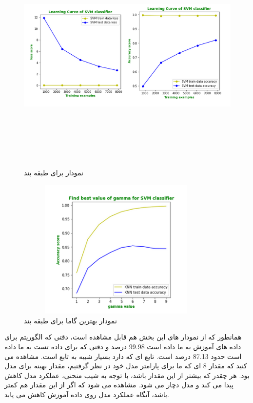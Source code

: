 \documentclass[12pt,onecolumn,a4paper]{article}
\begin{document}
\begin{figure}
  \centering
  \includegraphics[width=15cm,height=12cm,keepaspectratio]{13.png}
  \caption{نمودار  برای طبقه بند }
  \label{fig:LCSVM}
\end{figure}

\begin{figure}
  \centering
  \includegraphics[width=10cm,height=7cm,keepaspectratio]{14.png}
  \caption{نمودار بهترین گاما برای طبقه بند }
  \label{fig:BestGammaSVM}
\end{figure}

همانطور که از نمودار های این بخش هم قابل مشاهده است، دقتی که الگوریتم  برای داده های آموزش به ما داده است 99.98 درصد و دقتی که برای داده تست به ما داده است حدود 87.13 درصد است. تابع  ای که  دارد بسیار شبیه به تابع  است.
مشاهده می کنید که مقدار 8 ای که ما برای پارامتر  مدل خود در نظر گرفتیم، مقدار بهینه برای مدل بود. هر چقدر که بیشتر از این مقدار باشد، با توجه به شیب منحنی، عملکرد مدل کاهش پیدا می کند و مدل دچار  می شود. مشاهده می شود که اگر از این مقدار هم کمتر باشد، آنگاه عملکرد مدل روی داده آموزش کاهش می یابد.
\end{document}
